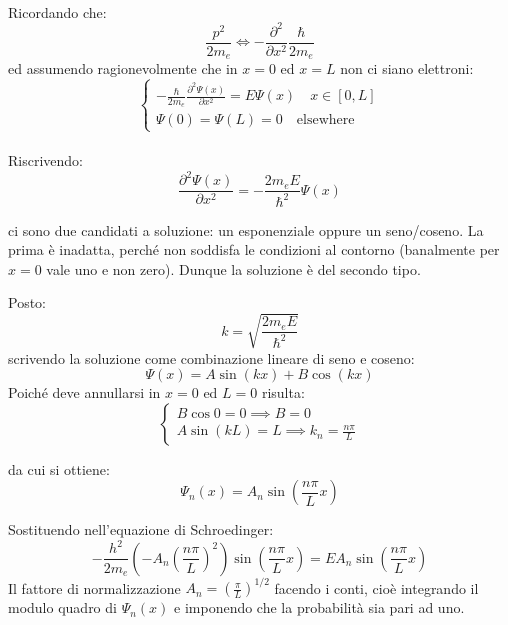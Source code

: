 \documentclass{book}
\begin{document}
            \paragraph{} Ricordando che:
            $$\frac{p^{2}}{2m_{e}} \iff - \frac{\partial ^{2}}{\partial x^{2}} \frac{\hbar}{2m_{e}}$$
            ed assumendo ragionevolmente che in $x=0$ ed $x=L$ non ci siano elettroni:
            $$\begin{cases}
                \displaystyle -\frac{\hbar}{2m_{e}}\frac{\partial ^{2} \Psi(x)}{\partial x^{2}} = E\Psi(x)  \quad x \in [0,L]\\
                \Psi(0) = \Psi(L) = 0 \quad \textrm{elsewhere}
            \end{cases}$$

            \paragraph{}
                Riscrivendo:
                $$\frac{\partial ^{2}\Psi(x)}{\partial x^{2}} = - \frac{2m_{e}E}{\hbar ^{2}} \Psi(x)$$

                ci sono due candidati a soluzione: un esponenziale oppure un seno/coseno. La prima è inadatta, perché non soddisfa le condizioni al contorno (banalmente per $x=0$ vale uno e non zero). Dunque la soluzione è del secondo tipo. \newline
               
                Posto:
                $$k = \sqrt{\frac{2m_{e}E}{\hbar ^{2}}}$$
                scrivendo la soluzione come combinazione lineare di seno e coseno:
                $$\Psi(x) = A \sin(kx) + B\cos(kx)$$
                Poiché deve annullarsi in $x=0$ ed $L=0$ risulta:
                $$\begin{cases}
                    B\cos{0} = 0 \implies B = 0 \\
                    A\sin(kL) = L \implies k_{n} = \displaystyle \frac{n\pi}{L} 
                \end{cases}$$

                da cui si ottiene:
                $$\Psi_{n}(x) = A_{n} \sin(\frac{n \pi}{L} x)$$

                Sostituendo nell'equazione di Schroedinger:
                $$-\frac{h^{2}}{2m_{e}}(-A_{n}(\frac{n\pi}{L})^{2})\sin(\frac{n \pi}{L}x) = EA_{n}\sin(\frac{n \pi}{L} x)$$
                Il fattore di normalizzazione $A_{n} = (\frac{\pi}{L})^{1/2}$ facendo i conti, cioè integrando il modulo quadro di $\Psi_{n}(x)$ e imponendo che la probabilità sia pari ad uno.
\end{document}
